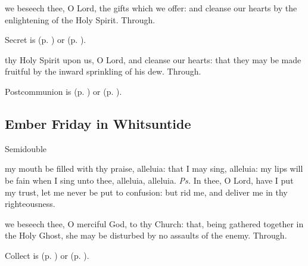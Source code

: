 \secret
{} we beseech thee, O Lord, the gifts which we offer: and cleanse our hearts by the enlightening of the Holy Spirit. Through.


\begin{rubric}
     Secret is  (p. \pageref{SPAgainst}) or  (p. \pageref{SPChiefBishop}).
\end{rubric}


\postcommunion
{} thy Holy Spirit upon us, O Lord, and cleanse our hearts: that they may be made fruitful by the inward sprinkling of his dew. Through.


\begin{rubric}
     Postcommunion is  (p. \pageref{SPAgainst}) or  (p. \pageref{SPChiefBishop}).
\end{rubric}


\clearpage
\subsection{Ember Friday in Whitsuntide}
\begin{inhead}
    {Semidouble}
\end{inhead}

\vspace{-0.5\baselineskip}

\introit
{} my mouth be filled with thy praise, alleluia: that I may sing, alleluia: my lips will be fain when I sing unto thee, alleluia, alleluia. \textit{Ps.} In thee, O Lord, have I put my trust, let me never be put to confusion: but rid me, and deliver me in thy righteousness.

\vspace{-0.25\baselineskip}

\collect
{} we beseech thee, O merciful God, to thy Church: that, being gathered together in the Holy Ghost, she may be disturbed by no assaults of the enemy. Through.
\begin{rubric}
     Collect is  (p. \pageref{SPAgainst}) or  (p. \pageref{SPChiefBishop}).
\end{rubric}

